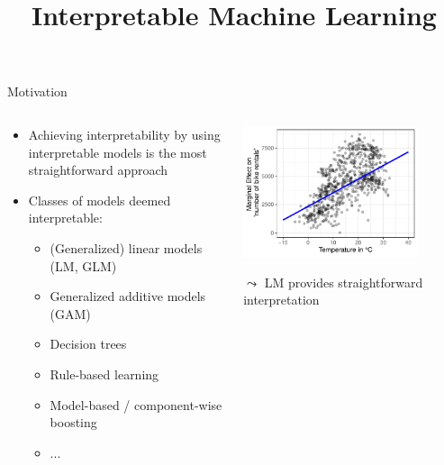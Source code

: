 \documentclass[11pt,compress,t,notes=noshow, aspectratio=169, xcolor=table]{beamer}
\title{Interpretable Machine Learning}
\date{}
\begin{document}
 

\newcommand{\titlefigure}{figure/whitebox}
\newcommand{\learninggoals}{
\item Why should we use interpretable models?
\item Advantages and disadvantages of interpretable models
}


\begin{frame}{Motivation}
\begin{columns}[T, totalwidth = \textwidth]
    \begin{column}{0.58\textwidth}
    \begin{itemize}
       \item Achieving interpretability by using interpretable models is the most straightforward approach
         \item Classes of models deemed interpretable:
   \begin{itemize}
  \footnotesize
  \item (Generalized) linear models (LM, GLM)
  \item Generalized additive models (GAM)
  \item Decision trees
  \item Rule-based learning
  \item Model-based / component-wise boosting
  \item ...
\end{itemize}
    \end{itemize}
    

    \end{column}
    \begin{column}{0.42\textwidth}  %
    \centering
  \includegraphics[width = 0.8\textwidth]{figure/main_effect_lm_temp.pdf}
  \begin{center}
    $\leadsto$ LM provides straightforward interpretation
  \end{center}


\end{column}
\end{columns}
\end{frame}
\end{document}
